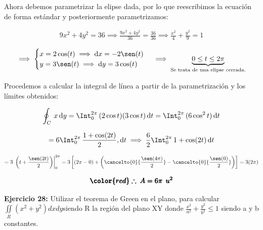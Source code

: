 \documentclass[12pt]{article}
\begin{document}
\noindent Ahora debemos parametrizar la elipse dada, por lo que reescribimos la ecuación de forma estándar y posteriormente parametrizamos:

\begin{align*}
	9x^2 + 4y^2 = 36 \implies \frac{9x^2 + 4y^2}{36} = \frac{36}{36} \implies \frac{x^2}{4} + \frac{y^2}{9} = 1
\end{align*}

\begin{align*}
	\implies \begin{cases}
		x = 2\cos(t) \implies \mathrm{d}x = -2\sen(t)\\
		y = 3\sen(t) \implies \mathrm{d}y = 3\cos(t)\\
	\end{cases} \implies \underbrace{0 \leq t \leq 2\pi}_{\text{Se trata de una elipse cerrada.}}
\end{align*}

\noindent Procedemos a calcular la integral de línea a partir de la parametrización y los límites obtenidos:

\begin{align*}
	\oint_C\, x\,\mathrm{d}y = \Int_{0}^{2\pi}\, (2\cos t)(3\cos t)\,\mathrm{d}t = \Int_{0}^{2\pi}\, (6\cos^2 t)\,\mathrm{d}t
\end{align*}

\begin{align*}
	= 6\Int_{0}^{2\pi}\, \frac{1+\cos(2t)}{2},\mathrm{d}t
	\implies \frac{6}{2}\Int_{0}^{2\pi}\, 1+\cos(2t)\,\mathrm{d}t
\end{align*}

\begin{align*}
	= 3\,\left.\left(t + \frac{\sen(2t)}{2}\right)\right|_{0}^{2\pi} = 3\left[ \left(2\pi - 0\right) + \left( \cancelto{0}{\frac{\sen(4\pi)}{2}} - \cancelto{0}{\frac{\sen(0)}{2}} \right) \right] = 3(2\pi)
\end{align*}

\begin{align*}
	\pmb{\color{red} \therefore\: A = 6\pi\: \: u^2}
\end{align*}

\noindent \textbf{Ejercicio 28:} Utilizar el teorema de Green en el plano, para calcular $\iint\limits_{R}{({{x}^{2}}+{{y}^{2}})dxdy}$siendo R la región del plano XY donde  $\frac{{{x}^{2}}}{{{a}^{2}}}+\frac{{{y}^{2}}}{{{b}^{2}}}\le 1$ siendo a y b constantes.

\vspace{5mm}
\end{document}

